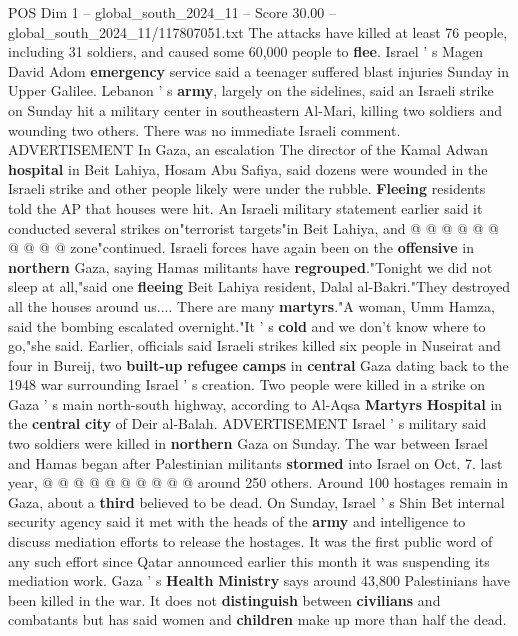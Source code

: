 \begin{textsample}{POS Dim 1 – global\_south\_2024\_11 – Score 30.00 – global\_south\_2024\_11/117807051.txt}
The attacks have killed at least 76 people, including 31 soldiers, and caused some 60,000 people to \textbf{flee}.
Israel ' s Magen David Adom \textbf{emergency} service said a teenager suffered blast injuries Sunday in Upper Galilee.
Lebanon ' s \textbf{army}, largely on the sidelines, said an Israeli strike on Sunday hit a military center in southeastern Al-Mari, killing two soldiers and wounding two others.
There was no immediate Israeli comment.
ADVERTISEMENT In Gaza, an escalation The director of the Kamal Adwan \textbf{hospital} in Beit Lahiya, Hosam Abu Safiya, said dozens were wounded in the Israeli strike and other people likely were under the rubble. \textbf{Fleeing} residents told the AP that houses were hit.
An Israeli military statement earlier said it conducted several strikes on"terrorist targets"in Beit Lahiya, and @ @ @ @ @ @ @ @ @ @ zone"continued.
Israeli forces have again been on the \textbf{offensive} in \textbf{northern} Gaza, saying Hamas militants have \textbf{regrouped}."Tonight we did not sleep at all,"said one \textbf{fleeing} Beit Lahiya resident, Dalal al-Bakri."They destroyed all the houses around us....
There are many \textbf{martyrs}."A woman, Umm Hamza, said the bombing escalated overnight."It ' s \textbf{cold} and we don't know where to go,"she said.
Earlier, officials said Israeli strikes killed six people in Nuseirat and four in Bureij, two \textbf{built-up} \textbf{refugee} \textbf{camps} in \textbf{central} Gaza dating back to the 1948 war surrounding Israel ' s creation.
Two people were killed in a strike on Gaza ' s main north-south highway, according to Al-Aqsa \textbf{Martyrs} \textbf{Hospital} in the \textbf{central} \textbf{city} of Deir al-Balah.
ADVERTISEMENT Israel ' s military said two soldiers were killed in \textbf{northern} Gaza on Sunday.
The war between Israel and Hamas began after Palestinian militants \textbf{stormed} into Israel on Oct. 7. last year, @ @ @ @ @ @ @ @ @ @ around 250 others.
Around 100 hostages remain in Gaza, about a \textbf{third} believed to be dead.
On Sunday, Israel ' s Shin Bet internal security agency said it met with the heads of the \textbf{army} and intelligence to discuss mediation efforts to release the hostages.
It was the first public word of any such effort since Qatar announced earlier this month it was suspending its mediation work.
Gaza ' s \textbf{Health} \textbf{Ministry} says around 43,800 Palestinians have been killed in the war.
It does not \textbf{distinguish} between \textbf{civilians} and combatants but has said women and \textbf{children} make up more than half the dead.

\end{textsample}
